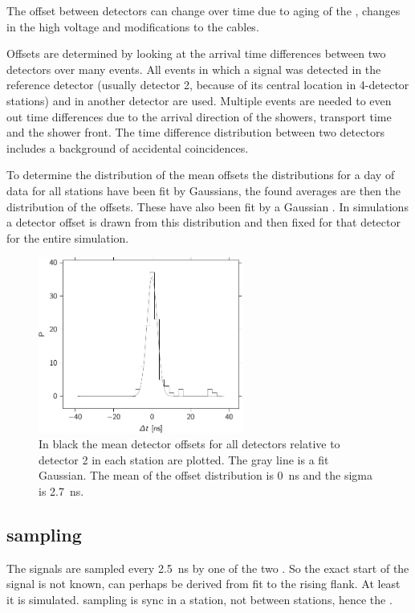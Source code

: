 The offset between detectors can change over time due to aging of the
\pmt, changes in the high voltage and modifications to the cables.

Offsets are determined by looking at the arrival time differences
between two detectors over many events. All events in which a signal was
detected in the reference detector (usually detector 2, because of its
central location in 4-detector stations) and in another detector are
used. Multiple events are needed to even out time differences due to the
arrival direction of the showers, transport time and the shower front.
The time difference distribution between two detectors includes a
background of accidental coincidences.

To determine the distribution of the mean offsets the distributions for
a day of data for all stations have been fit by Gaussians, the found
averages are then the distribution of the offsets. These have also been
fit by a Gaussian . In
simulations a detector offset is drawn from this distribution and then
fixed for that detector for the entire simulation.


\begin{figure}
    \centering
    \includegraphics[width=0.6\textwidth]
        {plots/response/detector_offset_distribution_20140101_d2.pdf}
    \caption{ In black the mean
             detector offsets for all detectors relative to detector 2
             in each station are plotted. The gray line is a fit
             Gaussian. The mean of the offset distribution is
             \SI{0}{\nano\second} and the sigma is
             \SI{2.7}{\nano\second}.}
    \label{fig:detector_offset_distribution}
\end{figure}


\subsection{\adc sampling}

The \pmt signals are sampled every \SI{2.5}{\nano\second} by one of the
two \adcs. So the exact start of the signal is not known, can perhaps be
derived from fit to the rising flank. At least it is simulated. sampling
is sync in a station, not between stations, hence the \gps.
